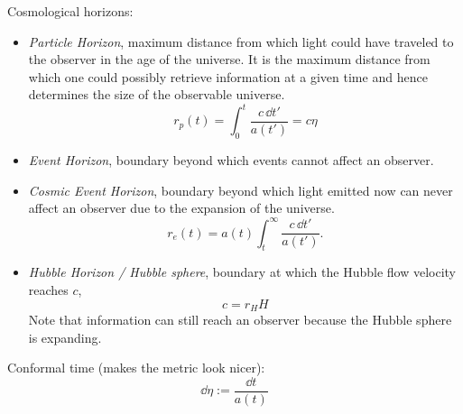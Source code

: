 		\noindent
		Cosmological horizons:
		\begin{itemize}
			\item \emph{Particle Horizon}, maximum distance from which light could have traveled to the observer in the age of the universe. It is the maximum distance from which one could possibly retrieve information at a given time and hence determines the size of the observable universe.
				\begin{equation}
					r_p(t) = \int_{0}^{t} \frac{c \,\dd t'}{a(t')} = c \eta
				\end{equation}
			\item \emph{Event Horizon}, boundary beyond which events cannot affect an observer.
			\item \emph{Cosmic Event Horizon}, boundary beyond which light emitted now can never affect an observer due to the expansion of the universe.
				\begin{equation}
					r_e(t) = a(t) \int^{\infty}_{t} \frac{c \,\dd t'}{a(t')}.
				\end{equation}
			\item \emph{Hubble Horizon / Hubble sphere}, boundary at which the Hubble flow velocity reaches $c$,
				\begin{equation}
					c = r_H H
				\end{equation}
				Note that information can still reach an observer because the Hubble sphere is expanding.
		\end{itemize}

		\noindent
		Conformal time (makes the metric look nicer):
		\begin{equation}
			\dd \eta := \frac{\dd t}{a(t)}
		\end{equation}

